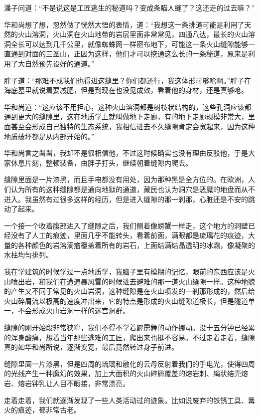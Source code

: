 潘子问道：“不是说这是工匠逃生的秘道吗？变成条瞄人缝了？这还走的过去嘛？”

华和尚想了想，忽然做了恍然大悟的表情，道：“我想这一条排道可能是利用了天然的火山溶洞，火山洞在火山地带的岩层里面非常常见，四通八达，最长的火山溶洞全长可以达到几千公里，就像蜘蛛网一样密布地下，可能这一条火山缝隙能够一直通到对面的三圣山，正因为这样，他们才可以挖通这么长的一条秘道，原来是利用了大自然预先设好的通道。”

胖子道：“那难不成我们也得进这缝里？你们都还行，我这体形可够呛啊。”胖子在海底墓里就说着要减肥，但是到现在也没见成效，看着他的身材，还是真够呛。

华和尚道：“这应该不用担心，这种火山溶洞都是树枝状结构的，这些孔洞应该都通到更大的缝隙里，这在地质学上就叫做地下走廊，有的地下走廊规模非常大，里面甚至会形成自己独特的生态系统，我相信进去不久缝隙肯定会宽起来，因为这种地质破坏都是从内部开始的。”

华和尚言之凿凿，我却不是很相信他，不过这时候确实也没有理由反驳他，于是大家休息片刻，整顿装备，由胖子打头，继续朝着缝隙内爬去。

缝隙里面是一片漆黑，而且手电都没有用处，因为那种黑是全方位的。在欧洲，人们认为所有的这种缝隙都是通向地狱的通道，藏民也认为洞穴是恶魔的地盘而从不进入。我虽然有过很多这样的经历，但是进入缝隙的那一刹那，心脏还是不安的跳动了起来。

一个接一个收着腹部进入了缝隙之后，我们侧着像螃蟹一样走，这个地方的洞壁已经没有了人工的痕迹，里面几乎不能转头，看着前面，满眼都是琉璃花的痕迹，大量的各种颜色的岩溶滴瘤覆盖着所有的岩石，上面结满结晶透明的冰霜，像凝聚的水柱均匀排列。

我在学建筑的时候学过一点地质学，我脑子里有模糊的记忆，眼前的东西应该是火山喷出岩，和我们在遭遇暴风雪的时候进去避难的那一道火山缝隙一样。这种地貌的产生又不同于常见的火山岩洞，这种缝隙是在火山喷发的一刹那形成的，然后给火山碎屑流以极高的速度冲出来，它的特点是形成的火山缝隙道极长，但是隧道单一，不会形成火山岩洞一样的迷宫洞群。

缝隙的刚开始段非常狭窄，我们不得不学着霹雳舞的动作挪动。没十五分钟已经累的浑身酸痛，想着当年那些逃难的工匠，爬出来也挺不容易。不过走着走着，缝隙真的如华和尚所说，逐渐变宽，最后竟然转过身子前进。

缝隙里面一片漆黑，但是四周的琉璃和融化的云母反射着我们的手电光，使得四周的光线产生一种魔幻的效果，加上大面积的火山碎屑覆盖的熔岩刺、绳状结壳熔岩、熔岩钟乳让人目不暇接，非常漂亮。

走着走着，我们就逐渐发现了一些人类活动过的迹象。比如说废弃的铁锈工具、篝火的痕迹，都非常古老。

